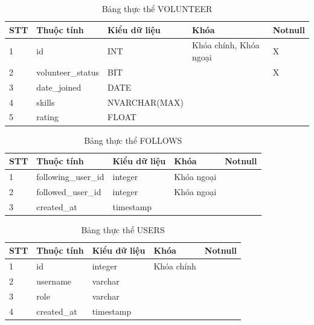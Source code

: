 \documentclass[../DoAn.tex]{subfiles}
\begin{document}
\begin{table}[H]
	\centering{}
	\begin{tabular}{m{1cm} m{4cm} m{3.5cm} m{3cm} m{1.5cm}}
		\hline
		\textbf{STT} & \textbf{Thuộc tính} & \textbf{Kiểu dữ liệu} & \textbf{Khóa}          & \textbf{Notnull}
		\\ \hline
		1            & id                  & INT                   & Khóa chính, Khóa ngoại & X
		\\ \hline
		2            & volunteer\_status   & BIT                   &                        & X
		\\ \hline
		3            & date\_joined        & DATE                  &                        &
		\\ \hline
		4            & skills              & NVARCHAR(MAX)         &                        &
		\\ \hline
		5            & rating              & FLOAT                 &                        &
		\\ \hline
	\end{tabular}
	\caption{Bảng thực thể VOLUNTEER}
\end{table}

\begin{table}[H]
	\centering{}
	\begin{tabular}{m{1cm} m{4cm} m{3.5cm} m{3cm} m{1.5cm}}
		\hline
		\textbf{STT} & \textbf{Thuộc tính} & \textbf{Kiểu dữ liệu} & \textbf{Khóa} & \textbf{Notnull}
		\\ \hline
		1            & following\_user\_id & integer               & Khóa ngoại    &
		\\ \hline
		2            & followed\_user\_id  & integer               & Khóa ngoại    &
		\\ \hline
		3            & created\_at         & timestamp             &               &
		\\ \hline
	\end{tabular}
	\caption{Bảng thực thể FOLLOWS}
\end{table}

\begin{table}[H]
	\centering{}
	\begin{tabular}{m{1cm} m{4cm} m{3.5cm} m{3cm} m{1.5cm}}
		\hline
		\textbf{STT} & \textbf{Thuộc tính} & \textbf{Kiểu dữ liệu} & \textbf{Khóa} & \textbf{Notnull}
		\\ \hline
		1            & id                  & integer               & Khóa chính    &
		\\ \hline
		2            & username            & varchar               &               &
		\\ \hline
		3            & role                & varchar               &               &
		\\ \hline
		4            & created\_at         & timestamp             &               &
		\\ \hline
	\end{tabular}
	\caption{Bảng thực thể USERS}
\end{table}
\end{document}
